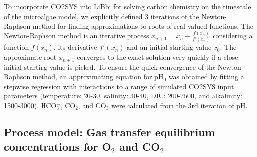 \documentclass{ruthesis}
\begin{document}
To incorporate CO2SYS into LiBbi for solving carbon chemistry on the timescale of the microalgae model, we explicitly defined 3 iterations of the Newton-Raphson method for finding approximations to roots of real valued functions. The Newton-Raphson method is an iterative process 
$ x_{n+1} = x_n - \frac{f(x_n)}{f'(x_n)} $
considering a function $f(x_n)$, its derivative $f'(x_n)$ and an initial starting value $x_0$. The approximate root $x_{n+1}$ converges to the exact solution very quickly if a close initial starting value is picked. To ensure the quick convergence of the Newton-Raphson method, an approximating equation for pH$_0$ was obtained by fitting a stepwise regression with interactions to a range of simulated CO2SYS input parameters (temperature: 20-30, salinity: 30-40, DIC: 200-2500, and alkalinity: 1500-3000). HCO$_3^-$, CO$_2$, and CO$_3$ were calculated from the 3rd iteration of pH.














\subsection{Process model: Gas transfer equilibrium concentrations for O$_2$ and CO$_2$}


\end{document}
